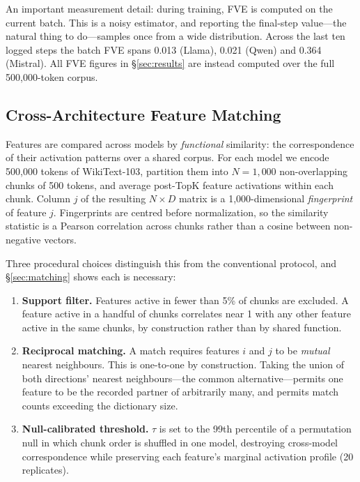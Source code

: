 \documentclass[11pt]{article}
\begin{document}
An important measurement detail: during training, FVE is computed on the current batch.
This is a noisy estimator, and reporting the final-step value---the natural thing to
do---samples once from a wide distribution. Across the last ten logged steps the batch
FVE spans 0.013 (Llama), 0.021 (Qwen) and 0.364 (Mistral). All FVE figures in
\S\ref{sec:results} are instead computed over the full 500{,}000-token corpus.

\subsection{Cross-Architecture Feature Matching}
\label{sec:matching-method}

Features are compared across models by \emph{functional} similarity: the correspondence
of their activation patterns over a shared corpus. For each model we encode 500{,}000
tokens of WikiText-103, partition them into $N = 1{,}000$ non-overlapping chunks of 500
tokens, and average post-TopK feature activations within each chunk. Column $j$ of the
resulting $N \times D$ matrix is a 1{,}000-dimensional \emph{fingerprint} of feature
$j$. Fingerprints are centred before normalization, so the similarity statistic is a
Pearson correlation across chunks rather than a cosine between non-negative vectors.

Three procedural choices distinguish this from the conventional protocol, and
\S\ref{sec:matching} shows each is necessary:

\begin{enumerate}
  \item \textbf{Support filter.} Features active in fewer than 5\% of chunks are
    excluded. A feature active in a handful of chunks correlates near 1 with any other
    feature active in the same chunks, by construction rather than by shared function.
  \item \textbf{Reciprocal matching.} A match requires features $i$ and $j$ to be
    \emph{mutual} nearest neighbours. This is one-to-one by construction. Taking the
    union of both directions' nearest neighbours---the common alternative---permits one
    feature to be the recorded partner of arbitrarily many, and permits match counts
    exceeding the dictionary size.
  \item \textbf{Null-calibrated threshold.} $\tau$ is set to the 99th percentile of a
    permutation null in which chunk order is shuffled in one model, destroying
    cross-model correspondence while preserving each feature's marginal activation
    profile (20 replicates).
\end{enumerate}
\end{document}
